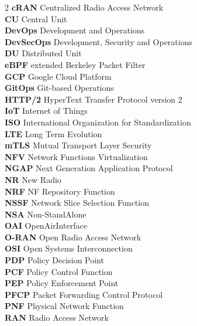 \begin{multicols}{2}
\textbf{cRAN} \quad Centralized Radio Access Network\\
\textbf{CU} \quad Central Unit\\
\textbf{DevOps} \quad Development and Operations\\
\textbf{DevSecOps} \quad Development, Security and Operations\\
\textbf{DU} \quad Distributed Unit\\
\textbf{eBPF} \quad extended Berkeley Packet Filter\\
\textbf{GCP} \quad Google Cloud Platform\\
\textbf{GitOps} \quad Git-based Operations\\
\textbf{HTTP/2} \quad HyperText Transfer Protocol version 2\\
\textbf{IoT} \quad Internet of Things\\
\textbf{ISO} \quad International Organization for Standardization\\
\textbf{LTE} \quad Long Term Evolution\\
\textbf{mTLS} \quad Mutual Transport Layer Security\\
\textbf{NFV} \quad Network Functions Virtualization\\
\textbf{NGAP} \quad Next Generation Application Protocol\\
\textbf{NR} \quad New Radio\\
\textbf{NRF} \quad NF Repository Function\\
\textbf{NSSF} \quad Network Slice Selection Function\\
\textbf{NSA} \quad Non-StandAlone\\
\textbf{OAI} \quad OpenAirInterface\\
\textbf{O-RAN} \quad Open Radio Access Network\\
\textbf{OSI} \quad Open Systems Interconnection\\
\textbf{PDP} \quad Policy Decision Point\\
\textbf{PCF} \quad Policy Control Function\\
\textbf{PEP} \quad Policy Enforcement Point\\
\textbf{PFCP} \quad Packet Forwarding Control Protocol\\
\textbf{PNF} \quad Physical Network Function\\
\textbf{RAN} \quad Radio Access Network\\

\end{multicols}
